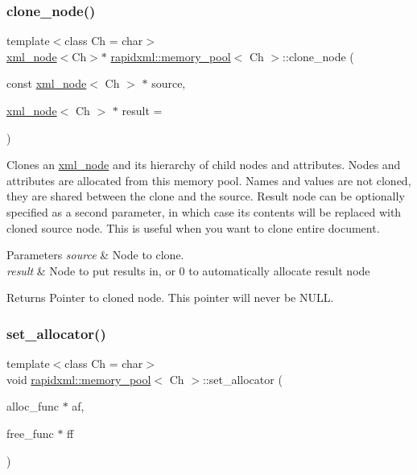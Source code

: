 \subsubsection{\texorpdfstring{clone\+\_\+node()}{clone\_node()}}
{\footnotesize\ttfamily template$<$class Ch  = char$>$ \\
\hyperlink{classrapidxml_1_1xml__node}{xml\+\_\+node}$<$Ch$>$$\ast$ \hyperlink{classrapidxml_1_1memory__pool}{rapidxml\+::memory\+\_\+pool}$<$ Ch $>$\+::clone\+\_\+node (\begin{DoxyParamCaption}\item[{const \hyperlink{classrapidxml_1_1xml__node}{xml\+\_\+node}$<$ Ch $>$ $\ast$}]{source,  }\item[{\hyperlink{classrapidxml_1_1xml__node}{xml\+\_\+node}$<$ Ch $>$ $\ast$}]{result = {} }\end{DoxyParamCaption})\hspace{0.3cm}{\ttfamily [inline]}}

Clones an \hyperlink{classrapidxml_1_1xml__node}{xml\+\_\+node} and its hierarchy of child nodes and attributes. Nodes and attributes are allocated from this memory pool. Names and values are not cloned, they are shared between the clone and the source. Result node can be optionally specified as a second parameter, in which case its contents will be replaced with cloned source node. This is useful when you want to clone entire document. 
\begin{DoxyParams}{Parameters}
{\em source} & Node to clone. \\
\hline
{\em result} & Node to put results in, or 0 to automatically allocate result node \\
\hline
\end{DoxyParams}
\begin{DoxyReturn}{Returns}
Pointer to cloned node. This pointer will never be N\+U\+LL. 
\end{DoxyReturn}
\mbox{\label{classrapidxml_1_1memory__pool_a84d3d8d2cdfc00501e1dcf26d889ae03}} 
\subsubsection{\texorpdfstring{set\+\_\+allocator()}{set\_allocator()}}
{\footnotesize\ttfamily template$<$class Ch  = char$>$ \\
void \hyperlink{classrapidxml_1_1memory__pool}{rapidxml\+::memory\+\_\+pool}$<$ Ch $>$\+::set\+\_\+allocator (\begin{DoxyParamCaption}\item[{alloc\+\_\+func $\ast$}]{af,  }\item[{free\+\_\+func $\ast$}]{ff }\end{DoxyParamCaption})\hspace{0.3cm}{\ttfamily [inline]}}

